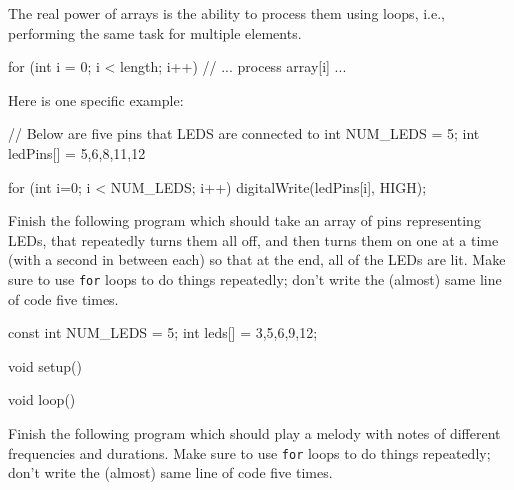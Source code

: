 
The real power of arrays is the ability to process them using loops, i.e., performing the same task for multiple elements.

\begin{javalst}
    for (int i = 0; i < length; i++) {
       // ... process array[i] ...
    }
\end{javalst}

Here is one specific example:

\begin{javalst}
  // Below are five pins that LEDS are connected to
  int NUM_LEDS = 5;
  int ledPins[] = {5,6,8,11,12}

  for (int i=0; i < NUM_LEDS; i++) {
    digitalWrite(ledPins[i], HIGH);
  }
\end{javalst}




\newpage

\Q \label{pairwiseMax} Finish the following program which should take an array
of pins representing LEDs, that repeatedly turns them all off, and then turns
them on one at a time (with a second in between each) so that at the end, all of
the LEDs are lit. Make sure to use \texttt{for} loops to do things repeatedly;
don't write the (almost) same line of code five times.


\begin{javalst}
const int NUM_LEDS = 5;
int leds[] = {3,5,6,9,12};

void setup()
{

  








}

void loop() {



  










  

  

}
\end{javalst}


\newpage


\Q Finish the following program which should play a melody with notes of
different frequencies and durations. Make sure to use \texttt{for} loops to do
things repeatedly; don't write the (almost) same line of code five times.


